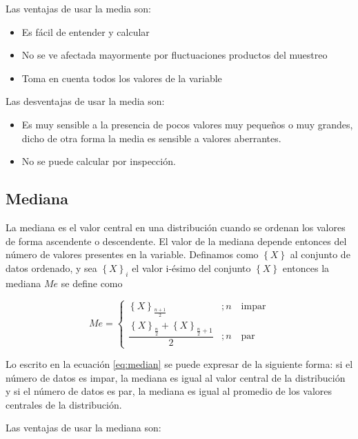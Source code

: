 \documentclass[]{book}
\providecommand{\tightlist}{%
  \setlength{\itemsep}{0pt}\setlength{\parskip}{0pt}}
\begin{document}
Las ventajas de usar la media son:

\begin{itemize}
\tightlist
\item
  Es fácil de entender y calcular
\item
  No se ve afectada mayormente por fluctuaciones productos del muestreo
\item
  Toma en cuenta todos los valores de la variable
\end{itemize}

Las desventajas de usar la media son:

\begin{itemize}
\tightlist
\item
  Es muy sensible a la presencia de pocos valores muy pequeños o muy
  grandes, dicho de otra forma la media es sensible a valores
  aberrantes.
\item
  No se puede calcular por inspección.
\end{itemize}

\subsection{Mediana}\label{mediana}

La mediana es el valor central en una distribución cuando se ordenan los
valores de forma ascendente o descendente. El valor de la mediana
depende entonces del número de valores presentes en la variable.
Definamos como \(\left\{ X \right \}\) al conjunto de datos ordenado, y
sea \(\left \{ X \right \}_i\) el valor i-ésimo del conjunto
\(\left \{ X \right \}\) entonces la mediana \(Me\) se define como

\begin{equation}
Me = \begin{cases} 
      \left \{ X \right\}_{\frac{n+1}{2}} & ; n \quad \textrm{impar}  \\
      \dfrac{\left \{ X  \right \}_{\frac{n}{2}} + \left \{ X  \right \}_{\frac{n}{2}+1} }{2} & ; n \quad \textrm{par}
   \end{cases}
   \label{eq:median}
\end{equation}

Lo escrito en la ecuación \eqref{eq:median} se puede expresar de la
siguiente forma: si el número de datos es impar, la mediana es igual al
valor central de la distribución y si el número de datos es par, la
mediana es igual al promedio de los valores centrales de la
distribución.

Las ventajas de usar la mediana son:
\end{document}
